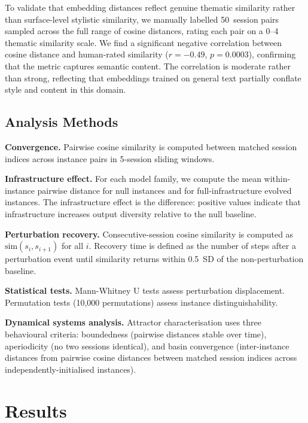 \documentclass{article}
\begin{document}
To validate that embedding distances reflect genuine thematic similarity
rather than surface-level stylistic similarity, we manually labelled 50~session
pairs sampled across the full range of cosine distances, rating each pair on a
0--4 thematic similarity scale. We find a significant negative correlation
between cosine distance and human-rated similarity ($r = -0.49$, $p = 0.0003$),
confirming that the metric captures semantic content. The correlation is
moderate rather than strong, reflecting that embeddings trained on general
text partially conflate style and content in this domain.

\subsection{Analysis Methods}

\textbf{Convergence.} Pairwise cosine similarity is computed between matched
session indices across instance pairs in 5-session sliding windows.

\textbf{Infrastructure effect.} For each model family, we compute the mean
within-instance pairwise distance for null instances and for full-infrastructure
evolved instances. The infrastructure effect is the difference: positive values
indicate that infrastructure increases output diversity relative to the null baseline.

\textbf{Perturbation recovery.} Consecutive-session cosine similarity is
computed as $\text{sim}(s_i, s_{i+1})$ for all $i$. Recovery time is defined
as the number of steps after a perturbation event until similarity returns
within 0.5~SD of the non-perturbation baseline.

\textbf{Statistical tests.} Mann-Whitney U tests assess perturbation
displacement. Permutation tests (10,000 permutations) assess instance
distinguishability.

\textbf{Dynamical systems analysis.} Attractor characterisation uses three
behavioural criteria: boundedness (pairwise distances stable over time),
aperiodicity (no two sessions identical), and basin convergence (inter-instance
distances from pairwise cosine distances between matched session indices across
independently-initialised instances).

\section{Results}
\label{sec:results}
\end{document}
